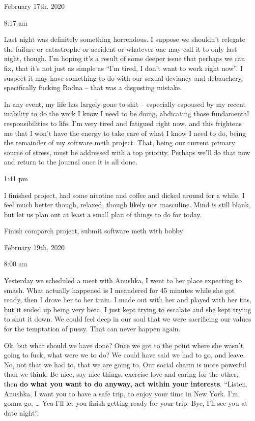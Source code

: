 \bigskip
\bigskip
February 17th, 2020

8:17 am

Last night was definitely something horrendous. I suppose we shouldn't
relegate the failure or catastrophe or accident or whatever one may call
it to only last night, though. I'm hoping it's a result of some deeper
issue that perhaps we can fix, that it's not just as simple as ``I'm
tired, I don't want to work right now''. I suspect it may have something
to do with our sexual deviancy and debauchery, specifically fucking
Rodna -- that was a disgusting mistake.

\qquad In any event, my life has largely gone to shit -- especially
espoused by my recent inability to do the work I know I need to be
doing, abdicating those fundamental responsibilities to life. I'm very
tired and fatigued right now, and this frightens me that I won't have
the energy to take care of what I know I need to do, being the remainder
of my software meth project. That, being our current primary source of
stress, must be addressed with a top priority. Perhaps we'll do that now
and return to the journal once it is all done.

1:41 pm

I finished project, had some nicotine and coffee and dicked around for a
while. I feel much better though, relaxed, though likely not masculine.
Mind is still blank, but let us plan out at least a small plan of things
to do for today.

Finish comparch project, submit software meth with bobby

\bigskip
\bigskip
February 19th, 2020

8:00 am

Yesterday we scheduled a meet with Anushka, I went to her place
expecting to smash. What actually happened is I meandered for 45 minutes
while she got ready, then I drove her to her train. I made out with her
and played with her tits, but it ended up being very beta. I just kept
trying to escalate and she kept trying to shut it down. We could feel
deep in our soul that we were sacrificing our values for the temptation
of pussy. That can never happen again.

\qquad Ok, but what should we have done? Once we got to the point where
she wasn't going to fuck, what were we to do? We could have said we had
to go, and leave. No, not that we had to, that we are going to. Our
social charm is more powerful than we think. Be nice, say nice things,
exercise love and caring for the other, then \textbf{do what you want to
do anyway, act within your interests}. ``Listen, Anushka, I want you to
have a safe trip, to enjoy your time in New York. I'm gonna go, \ldots{}
Yea I'll let you finish getting ready for your trip. Bye, I'll see you
at date night''.

